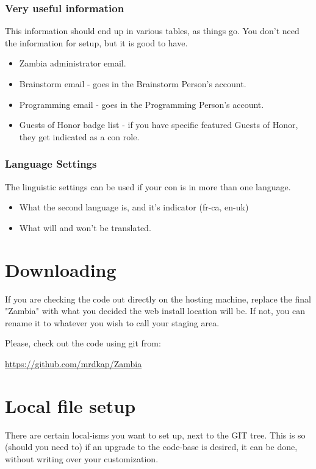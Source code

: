 \documentclass[captions=tablesignature]{scrartcl}
\begin{document}
\subsubsection{Very useful information}
\label{sec-1-2-6}
This information should end up in various tables, as things go.
You don't need the information for setup, but it is good to have.
\begin{itemize}
\item Zambia administrator email.
\item Brainstorm email - goes in the Brainstorm Person's account.
\item Programming email - goes in the Programming Person's account.
\item Guests of Honor badge list - if you have specific featured Guests
of Honor, they get indicated as a con role.
\end{itemize}

\subsubsection{Language Settings}
\label{sec-1-2-7}
The linguistic settings can be used if your con is in more than
one language.
\begin{itemize}
\item What the second language is, and it's indicator (fr-ca, en-uk)
\item What will and won't be translated.
\end{itemize}

\section{Downloading}
\label{sec-2}
If you are checking the code out directly on the hosting machine,
replace the final "Zambia" with what you decided the web install
location will be.  If not, you can rename it to whatever you wish to
call your staging area.

Please, check out the code using git from:

\url{https://github.com/mrdkap/Zambia}
\section{Local file setup}
\label{sec-3}
There are certain local-isms you want to set up, next to the GIT 
tree. This is so (should you need to) if an upgrade to the code-base
is desired, it can be done, without writing over your
customization.
\end{document}
